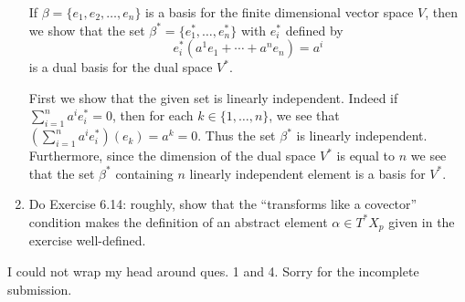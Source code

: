 \documentclass[12pt]{article}
\begin{document}
\begin{enumerate}
\begin{mybox}
    
    If $\beta=\{e_1, e_2,\ldots, e_n\}$ is a basis for the
    finite dimensional vector space $V$, then we show
    that the set $\beta^*=\{e_1^*,\ldots,e_n^*\}$ with
    $e_i^*$ defined by
    $$e_i^*(a^1e_1+\cdots+a^ne_n)=a^i$$
    is a dual basis for the dual space $V^*$.

    \vspace*{2mm}
    First we show that the given set is linearly
    independent. Indeed if $\sum_{i=1}^n{a^ie_i^*}=0$,
    then for each $k\in\{1,\ldots, n\}$, we see that
    $(\sum_{i=1}^n{a^ie_i^*})(e_k)=a^k=0.$ Thus the
    set $\beta^*$ is linearly independent. Furthermore,
    since the dimension of the dual space $V^*$ is
    equal to $n$ we see that the set $\beta^*$
    containing $n$ linearly independent element is
    a basis for $V^*$.
\end{mybox}

\item Do Exercise 6.14: roughly, show that the “transforms
like a covector” condition makes
the definition of an abstract element $\alpha\in T^* X_p$
given in the exercise well-defined.

\begin{mybox}
    
\end{mybox}
\end{enumerate}

I could not wrap my head around ques. 1 and 4. Sorry for the
incomplete submission.
\end{document}
